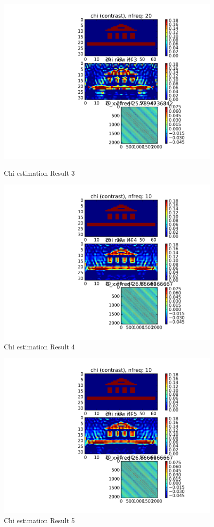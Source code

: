 \documentclass[10pt,a4paper]{article}
\begin{document}
\begin{figure}
\centering
 \includegraphics[scale=0.75]{Chi_est_it02.png}
  \caption{Chi estimation Result 3}
  \label{fig:fig6}
 \includegraphics[scale=0.75]{Chi_est_it03.png}
  \caption{Chi estimation Result 4}
  \label{fig:fig7}
\end{figure}

\begin{figure}
\centering
 \includegraphics[scale=0.75]{Chi_est_it04.png}
  \caption{Chi estimation Result 5}
  \label{fig:fig8}
\end{figure}
\end{document}
